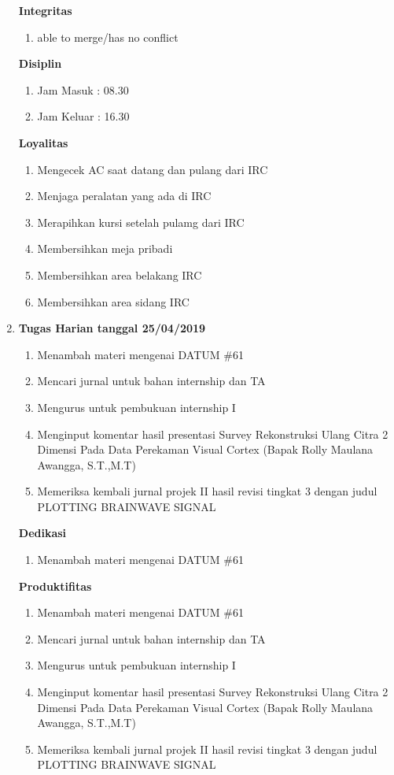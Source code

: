 \begin{enumerate}
\textbf{Integritas}
\begin{enumerate}
\item able to merge/has no conflict
\end{enumerate}

\textbf{Disiplin}
\begin{enumerate}
\item Jam Masuk : 08.30
\item Jam Keluar : 16.30
\end{enumerate}

\textbf{Loyalitas}
\begin{enumerate}
\item Mengecek AC saat datang dan pulang dari IRC
\item Menjaga peralatan yang ada di IRC
\item Merapihkan kursi setelah pulamg dari IRC
\item Membersihkan meja pribadi
\item Membersihkan area belakang IRC
\item Membersihkan area sidang IRC
\end{enumerate}



\item \textbf{Tugas Harian tanggal 25/04/2019}
\begin{enumerate}
\item Menambah materi mengenai DATUM \#61
\item Mencari jurnal untuk bahan internship dan TA
\item Mengurus untuk pembukuan internship I 
\item Menginput komentar hasil presentasi Survey Rekonstruksi Ulang Citra 2 Dimensi Pada Data Perekaman Visual Cortex (Bapak Rolly Maulana Awangga, S.T.,M.T)
\item Memeriksa kembali jurnal projek II hasil revisi tingkat 3 dengan judul PLOTTING BRAINWAVE SIGNAL
\end{enumerate}

\textbf{Dedikasi}
\begin{enumerate}
\item Menambah materi mengenai DATUM \#61
\end{enumerate}

\textbf{Produktifitas}
\begin{enumerate}
\item Menambah materi mengenai DATUM \#61
\item Mencari jurnal untuk bahan internship dan TA
\item Mengurus untuk pembukuan internship I 
\item Menginput komentar hasil presentasi Survey Rekonstruksi Ulang Citra 2 Dimensi Pada Data Perekaman Visual Cortex (Bapak Rolly Maulana Awangga, S.T.,M.T)
\item Memeriksa kembali jurnal projek II hasil revisi tingkat 3 dengan judul PLOTTING BRAINWAVE SIGNAL
\end{enumerate}


\end{enumerate}

